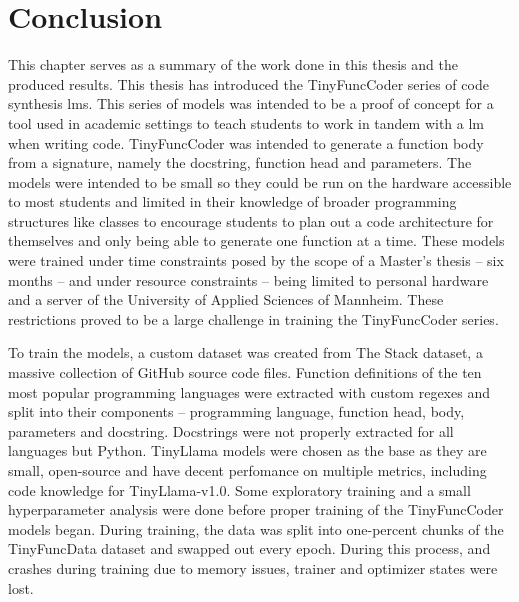 \chapter{Conclusion}
\label{chap:conclusion}
This chapter serves as a summary of the work done in this thesis and the produced results.
This thesis has introduced the TinyFuncCoder series of code synthesis \acp{lm}.
This series of models was intended to be a proof of concept for a tool used in academic settings to teach students to work in tandem with a \ac{lm} when writing code.
TinyFuncCoder was intended to generate a function body from a signature, namely the docstring, function head and parameters.
The models were intended to be small so they could be run on the hardware accessible to most students and limited in their knowledge of broader programming structures like classes to encourage students to plan out a code architecture for themselves and only being able to generate one function at a time.
These models were trained under time constraints posed by the scope of a Master's thesis -- six months -- and under resource constraints -- being limited to personal hardware and a server of the University of Applied Sciences of Mannheim.
These restrictions proved to be a large challenge in training the TinyFuncCoder series.

To train the models, a custom dataset was created from The Stack dataset, a massive collection of GitHub source code files.
Function definitions of the ten most popular programming languages were extracted with custom \ac{regex}es and split into their components -- programming language, function head, body, parameters and docstring.
Docstrings were not properly extracted for all languages but Python.
TinyLlama models were chosen as the base as they are small, open-source and have decent perfomance on multiple metrics, including code knowledge for TinyLlama-v1.0.
Some exploratory training and a small hyperparameter analysis were done before proper training of the TinyFuncCoder models began.
During training, the data was split into one-percent chunks of the TinyFuncData dataset and swapped out every epoch.
During this process, and crashes during training due to memory issues, trainer and optimizer states were lost.

